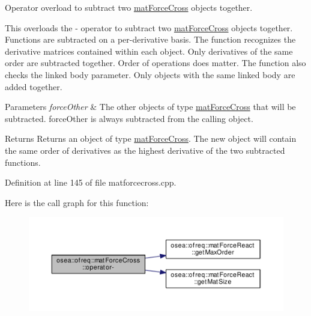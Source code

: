 Operator overload to subtract two \hyperlink{classosea_1_1ofreq_1_1mat_force_cross}{mat\-Force\-Cross} objects together. 

This overloads the -\/ operator to subtract two \hyperlink{classosea_1_1ofreq_1_1mat_force_cross}{mat\-Force\-Cross} objects together. Functions are subtracted on a per-\/derivative basis. The function recognizes the derivative matrices contained within each object. Only derivatives of the same order are subtracted together. Order of operations does matter. The function also checks the linked body parameter. Only objects with the same linked body are added together. 
\begin{DoxyParams}{Parameters}
{\em force\-Other} & The other objects of type \hyperlink{classosea_1_1ofreq_1_1mat_force_cross}{mat\-Force\-Cross} that will be subtracted. force\-Other is always subtracted from the calling object. \\
\hline
\end{DoxyParams}
\begin{DoxyReturn}{Returns}
Returns an object of type \hyperlink{classosea_1_1ofreq_1_1mat_force_cross}{mat\-Force\-Cross}. The new object will contain the same order of derivatives as the highest derivative of the two subtracted functions. 
\end{DoxyReturn}


Definition at line 145 of file matforcecross.\-cpp.



Here is the call graph for this function\-:
\nopagebreak
\begin{figure}[H]
\begin{center}
\leavevmode
\includegraphics[width=350pt]{classosea_1_1ofreq_1_1mat_force_cross_af22b49c1536dc753f99b34a3eba1c8e7_cgraph}
\end{center}
\end{figure}


